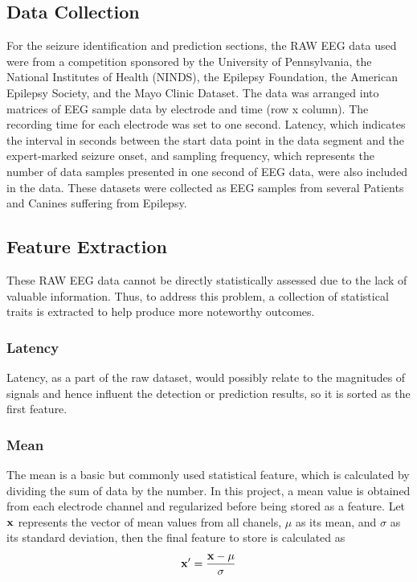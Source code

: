 \documentclass[10pt,twocolumn,letterpaper]{article}
\begin{document}
\subsection{Data Collection}
For the seizure identification and prediction sections, the RAW EEG data used were from a competition sponsored by the University of Pennsylvania, the National Institutes of Health (NINDS), the Epilepsy Foundation, the American Epilepsy Society, and the Mayo Clinic Dataset. The data was arranged into matrices of EEG sample data by electrode and time (row x column). The recording time for each electrode was set to one second. Latency, which indicates the interval in seconds between the start data point in the data segment and the expert-marked seizure onset, and sampling frequency, which represents the number of data samples presented in one second of EEG data, were also included in the data. These datasets were collected as EEG samples from several Patients and Canines suffering from Epilepsy\cite{Competition}.

\subsection{Feature Extraction}
These RAW EEG data cannot be directly statistically assessed due to the lack of valuable information.
Thus, to address this problem, a collection of statistical traits is extracted to help produce more noteworthy outcomes. 
\subsubsection{Latency}
Latency, as a part of the raw dataset, would possibly relate to the magnitudes of signals and hence influent the detection or prediction results, so it is sorted as the first feature.

\subsubsection{Mean}
The mean is a basic but commonly used statistical feature, which is calculated by dividing the sum of data by the number. In this project, a mean value is obtained from each electrode channel and regularized before being stored as a feature. Let ${\bf x}$ represents the vector of mean values from all chanels, $\mu$ as its mean, and $\sigma$ as its standard deviation, then the final feature to store is calculated as
\begin{equation}
{\bf x'} = \frac{{\bf x}-\mu}{\sigma}
\end{equation}
\end{document}
